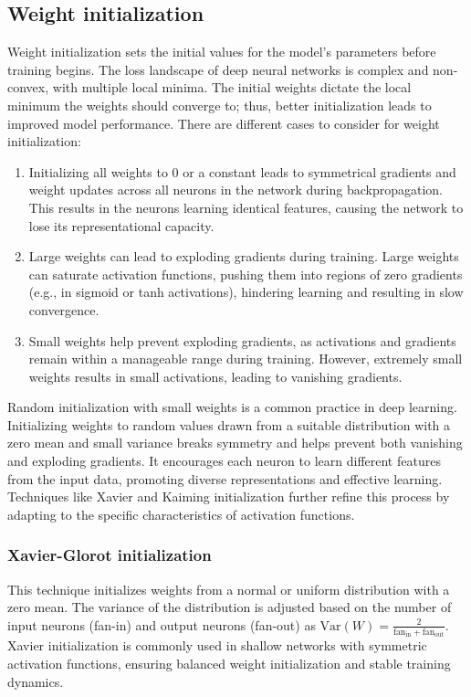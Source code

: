 \subsection{Weight initialization}
Weight initialization sets the initial values for the model's parameters before training begins. The loss landscape of deep neural networks is complex and non-convex, with multiple local minima. The initial weights dictate the local minimum the weights should converge to; thus, better initialization leads to improved model performance. There are different cases to consider for weight initialization: 
\begin{enumerate}
\item Initializing all weights to 0 or a constant leads to symmetrical gradients and weight updates across all neurons in the network during backpropagation. This results in the neurons learning identical features, causing the network to lose its representational capacity.
\item Large weights can lead to exploding gradients during training. Large weights can saturate activation functions, pushing them into regions of zero gradients (e.g., in sigmoid or tanh activations), hindering learning and resulting in slow convergence.
\item Small weights help prevent exploding gradients, as activations and gradients remain within a manageable range during training. However, extremely small weights results in small activations, leading to vanishing gradients. 
\end{enumerate}
Random initialization with small weights is a common practice in deep learning. Initializing weights to random values drawn from a suitable distribution with a zero mean and small variance breaks symmetry and helps prevent both vanishing and exploding gradients. It encourages each neuron to learn different features from the input data, promoting diverse representations and effective learning. Techniques like Xavier and Kaiming initialization further refine this process by adapting to the specific characteristics of activation functions.
\subsubsection{Xavier-Glorot initialization}
This technique \cite{glorot} initializes weights from a normal or uniform distribution with a zero mean. The variance of the distribution is adjusted based on the number of input neurons (fan-in) and output neurons (fan-out) as $\text{Var}(W) = \frac{2}{\text{fan}_{\text{in}} + \text{fan}_{\text{out}}}$. Xavier initialization is commonly used in shallow networks with symmetric activation functions, ensuring balanced weight initialization and stable training dynamics. 
